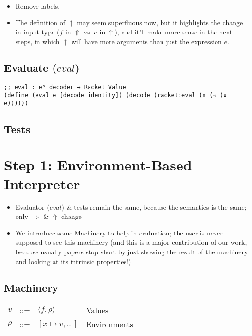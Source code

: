\documentclass[12pt, oneside]{book}
\begin{document}
\begin{itemize}
  \item Remove labels.
  \item The definition of \(↑\) may seem superfluous now, but it highlights the change in input type (\(f\) in \(⇑\) vs. \(e\) in \(↑\)), and it’ll make more sense in the next steps, in which \(↑\) will have more arguments than just the expression \(e\).
\end{itemize}

\subsection{Evaluate (\(eval\))}

\begin{Verbatim}
;; eval : eˢ decoder → Racket Value
(define (eval e [decode identity]) (decode (racket:eval (⇑ (⇒ (⇓ e))))))
\end{Verbatim}

\subsection{Tests}

\section{Step 1: Environment-Based Interpreter}

\begin{itemize}
  \item Evaluator (\(eval\)) \& tests remain the same, because the semantics is the same; only \(⇒\) \& \(⇑\) change
  \item We introduce some Machinery to help in evaluation; the user is never supposed to see this machinery (and this is a major contribution of our work, because usually papers stop short by just showing the result of the machinery and looking at its intrinsic properties!)
\end{itemize}

\subsection{Machinery}

\begin{tabular}{rcll}
  \(v\) & ::= & \(⟨f, ρ⟩\)       & Values       \\
  \(ρ\) & ::= & \([x ↦ v, ...]\) & Environments \\
\end{tabular}
\end{document}
